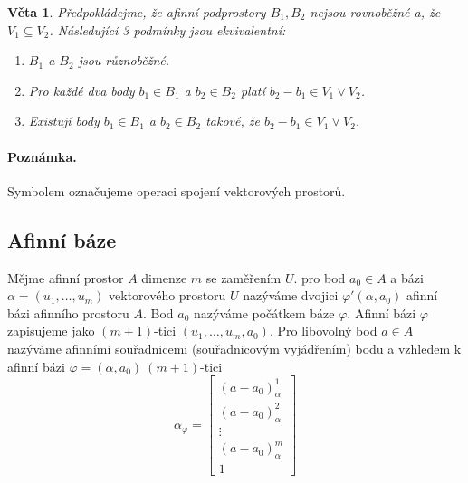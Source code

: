 \documentclass[12pt,a4paper]{article}
\newtheorem{sentence}{Věta}
\begin{document}
\begin{sentence}
	Předpokládejme, že afinní podprostory $B_1,B_2$ nejsou rovnoběžné a, že $V_1 \subseteq V_2$. Následující 3 podmínky jsou ekvivalentní:
	\begin{enumerate}
		\item $B_1$ a $B_2$ jsou různoběžné.
		\item Pro každé dva body $b_1 \in B_1$ a $b_2 \in B_2$ platí $b_2 - b_1 \in V_1 \vee V_2$.
		\item Existují body  $b_1 \in B_1$ a $b_2 \in B_2$ takové, že $b_2 - b_1 \in V_1 \vee V_2$. 
	\end{enumerate}
\end{sentence}
\paragraph{Poznámka.} Symbolem \uv{$\vee$} označujeme operaci spojení vektorových prostorů.


\subsection{Afinní báze}
Mějme afinní prostor $A$ dimenze $m$ se zaměřením $U$. pro bod $a_0 \in A$ a bázi $\alpha = (u_1, \dots, u_m)$ vektorového prostoru $U$ nazýváme dvojici $\varphi '(\alpha, a_0)$ afinní bázi afinního prostoru $A$. Bod $a_0$ nazýváme počátkem báze $\varphi$. Afinní bázi $\varphi$ zapisujeme jako $(m + 1)$-tici $(u_1, \dots, u_m,a_0)$. Pro libovolný bod $a \in A$ nazýváme afinními souřadnicemi (souřadnicovým vyjádřením) bodu a vzhledem k afinní bázi $\varphi = (\alpha, a_0)\ (m + 1)$-tici
\begin{displaymath}
	\alpha_\varphi = \left[ \begin{array}{c}
						(a - a_0)^1_\alpha \\
						(a - a_0)^2_\alpha \\
						\vdots \\
						(a - a_0)^m_\alpha \\
						1 
					    \end{array} \right]
\end{displaymath}
\end{document}
